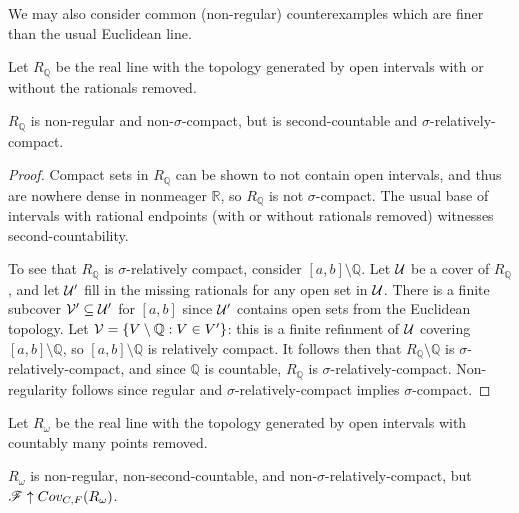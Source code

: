 We may also consider common (non-regular) counterexamples which are finer
than the usual Euclidean line.

\begin{defn}
  Let $R_{\mathbb Q}$ be the real line with the topology generated by open
  intervals with or without the rationals removed.
\end{defn}

\begin{thm}
  $R_{\mathbb Q}$ is non-regular and non-$\sigma$-compact, but is
  second-countable and $\sigma$-relatively-compact.
\end{thm}

\begin{proof}
  Compact sets in $R_{\mathbb Q}$ can be shown to not contain open intervals,
  and thus are nowhere dense in nonmeager $\mathbb R$,
  so $R_{\mathbb Q}$ is not $\sigma$-compact. The usual base of
  intervals with rational endpoints (with or without rationals removed)
  witnesses second-countability.

  To see that $R_{\mathbb Q}$ is $\sigma$-relatively compact, consider
  $[a,b]\setminus\mathbb{Q}$. Let $\mathcal{U}$ be a cover of $R_{\mathbb Q}$, and
  let $\mathcal{U}'$ fill in the missing rationals for any open set in $\mathcal{U}$.
  There is a finite subcover $\mathcal{V}'\subseteq \mathcal{U}'$ for $[a,b]$ since
  $\mathcal{U}'$ contains open sets from the Euclidean topology. Let
  $\mathcal{V}= \{V\setminus\mathbb{Q}:V\in V'\}$: this is a finite refinment of
  $\mathcal{U}$ covering $[a,b]\setminus\mathbb{Q}$, so $[a,b]\setminus\mathbb{Q}$
  is relatively compact. It follows then that $R_{\mathbb Q}\setminus\mathbb Q$
  is $\sigma$-relatively-compact, and since $\mathbb Q$ is countable,
  $R_{\mathbb Q}$ is $\sigma$-relatively-compact. Non-regularity follows since
  regular and $\sigma$-relatively-compact implies $\sigma$-compact.
\end{proof}

\begin{defn}
  Let $R_\omega$ be the real line with the topology generated by open
  intervals with countably many points removed.
\end{defn}

\begin{thm}
  $R_\omega$ is non-regular, non-second-countable, and
  non-$\sigma$-relatively-compact, but $\mathscr{F}\uparrow Cov_{C,F}(R_\omega)$.
\end{thm}

